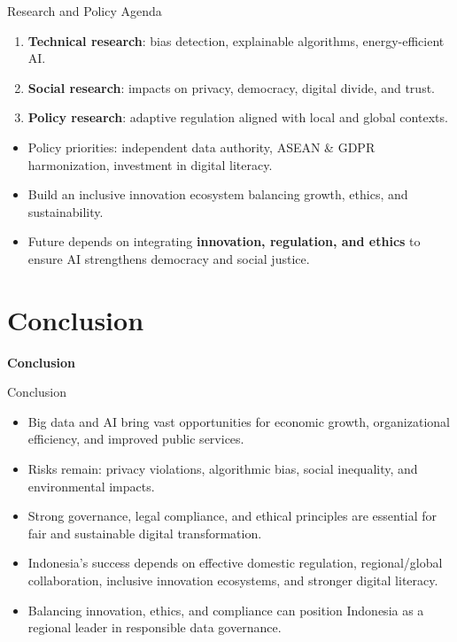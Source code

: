 \documentclass[aspectratio=169, table]{beamer}
\begin{document}
\begin{frame}{Research and Policy Agenda}
	\vspace{20pt}
	\begin{enumerate}
		\item \textbf{Technical research}: bias detection, explainable algorithms, energy-efficient AI.  
		\item \textbf{Social research}: impacts on privacy, democracy, digital divide, and trust.  
		\item \textbf{Policy research}: adaptive regulation aligned with local and global contexts.  
	\end{enumerate}
	\begin{itemize}
		\item Policy priorities: independent data authority, ASEAN \& GDPR harmonization, investment in digital literacy.  
		\item Build an inclusive innovation ecosystem balancing growth, ethics, and sustainability.  
		\item Future depends on integrating \textbf{innovation, regulation, and ethics} to ensure AI strengthens democracy and social justice.  
	\end{itemize}
\end{frame}

\section{Conclusion}

\begin{frame}{\hfill}
	\centering
	\Huge{\textbf{Conclusion}}
\end{frame}

\begin{frame}{Conclusion}
	\vspace{20pt}
	\begin{itemize}
		\item Big data and AI bring vast opportunities for economic growth, organizational efficiency, and improved public services.  
		\item Risks remain: privacy violations, algorithmic bias, social inequality, and environmental impacts.  
		\item Strong governance, legal compliance, and ethical principles are essential for fair and sustainable digital transformation.  
		\item Indonesia’s success depends on effective domestic regulation, regional/global collaboration, inclusive innovation ecosystems, and stronger digital literacy.  
		\item Balancing innovation, ethics, and compliance can position Indonesia as a regional leader in responsible data governance.  
	\end{itemize}
\end{frame}
\end{document}
